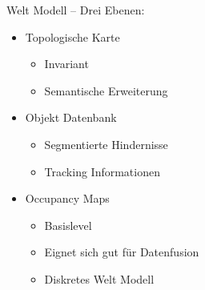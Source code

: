 Welt Modell -- Drei Ebenen:
\begin{itemize}
	\item Topologische Karte
	\begin{itemize}
		\item Invariant
		\item Semantische Erweiterung
	\end{itemize}
	\item Objekt Datenbank
	\begin{itemize}
		\item Segmentierte Hindernisse
		\item Tracking Informationen
	\end{itemize}
	\item Occupancy Maps
	\begin{itemize}
		\item Basislevel
		\item Eignet sich gut für Datenfusion
		\item Diskretes Welt Modell
	\end{itemize}
\end{itemize}


